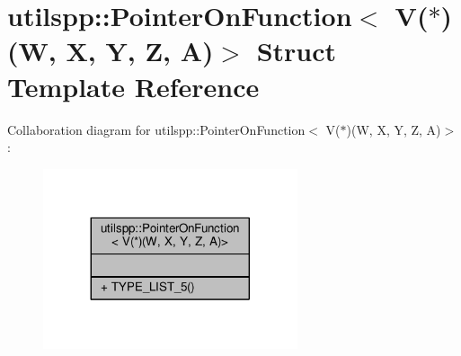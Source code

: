 \hypertarget{structutilspp_1_1PointerOnFunction_3_01V_07_5_08_07W_00_01X_00_01Y_00_01Z_00_01A_08_4}{\section{utilspp\-:\-:Pointer\-On\-Function$<$ V($\ast$)(W, X, Y, Z, A)$>$ Struct Template Reference}
\label{structutilspp_1_1PointerOnFunction_3_01V_07_5_08_07W_00_01X_00_01Y_00_01Z_00_01A_08_4}
}


Collaboration diagram for utilspp\-:\-:Pointer\-On\-Function$<$ V($\ast$)(W, X, Y, Z, A)$>$\-:
\nopagebreak
\begin{figure}[H]
\begin{center}
\leavevmode
\includegraphics[width=212pt]{structutilspp_1_1PointerOnFunction_3_01V_07_5_08_07W_00_01X_00_01Y_00_01Z_00_01A_08_4__coll__graph}
\end{center}
\end{figure}
